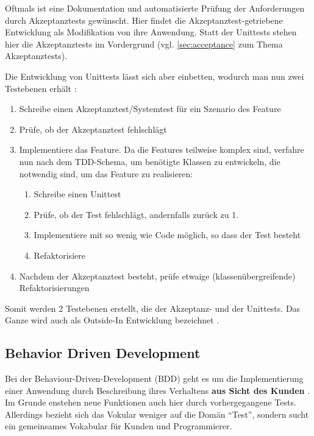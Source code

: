 Oftmals ist eine Dokumentation und automatisierte Prüfung der Anforderungen durch Akzeptanztests gewünscht. Hier findet die Akzeptanztest-getriebene Entwicklung als Modifikation von  ihre Anwendung. Statt der Unittests stehen hier die Akzeptanztests im Vordergrund (vgl. \ref{sec:acceptance} zum Thema Akzeptanztests).


Die Entwicklung von Unittests lässt sich aber einbetten, wodurch man nun zwei Testebenen erhält \citep[S. 285]{chelimsky_rspec_2010}:

\begin{enumerate}
 \item Schreibe einen Akzeptanztest/Systemtest für ein Szenario des Feature
 \item Prüfe, ob der Akzeptanztest fehlschlägt

 \item Implementiere das Feature. Da die Features teilweise komplex sind, verfahre nun nach dem TDD-Schema, um benötigte Klassen zu entwickeln, die notwendig sind, um das Feature zu realisieren:
 \begin{enumerate}
   \item Schreibe einen Unittest
   \item Prüfe, ob der Test fehlschlägt, andernfalls zurück zu 1.
   \item Implementiere mit so wenig wie Code möglich, so dass der Test besteht
   \item Refaktorisiere
 \end{enumerate}

 \item Nachdem der Akzeptanztest besteht, prüfe etwaige (klassenübergreifende) Refaktorisierungen

\end{enumerate}

Somit werden 2 Testebenen erstellt, die der Akzeptanz- und der Unittests. Das Ganze wird auch als Outside-In Entwicklung bezeichnet \citep{chelimsky_rspec_2010}.

\subsection{Behavior Driven Development}
\label{sec:tddBdd}
Bei der Behaviour-Driven-Development (BDD) geht es um die Implementierung einer Anwendung durch Beschreibung ihres Verhaltens \textbf{aus Sicht des Kunden} \citep[S. 138]{chelimsky_rspec_2010}. Im Grunde enstehen neue Funktionen auch hier durch vorhergegangene Tests. Allerdings bezieht sich das Vokular weniger auf die Domän "`Test"', sondern sucht ein gemeinsames Vokabular für Kunden und Programmierer.

